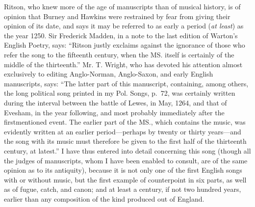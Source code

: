 \renewcommand\versoheader{manuscripts---thirteenth century.}
\renewcommand\rectoheader{sumer is icumen in.}

Ritson, who knew more of the age of manuscripts than of musical history, is
of opinion that Burney and Hawkins were restrained by fear from giving their
opinion of its date, and says it may be referred to as early a period (\textit{at least}) as
the year 1250. Sir Frederick Madden, %
in a note to the last edition of Warton’s
English Poetry, says: “Ritson justly exclaims against the ignorance of those who
refer the song to the fifteenth century, when the MS. itself is certainly of the
middle of the thirteenth.” Mr. T. Wright, who has devoted his attention
almost exclusively to editing Anglo-Norman, Anglo-Saxon, and early English
manuscripts, says: “The latter part of this manuscript, containing, among others,
the long political song printed in my Pol. Songs, p.~72, was certainly written
during the interval between the battle of Lewes, in May, 1264, and that of
Evesham, in the year following, and most probably immediately after the firstmentioned
event. The earlier part of the MS., 
which contains the music, was evidently written at an earlier \pagebreak period—perhaps by twenty or 
thirty years—and 
the song with its music must therefore be given to the first half of the thirteenth 
century, at latest.” I have thus entered into detail concerning this song
(though all the judges of manuscripts, whom I have been enabled to consult, are
of the same opinion as to its antiquity), because it is not only one of the first
English songs with or without music, but the first example of counterpoint in six
parts, as well as of fugue, catch, and canon; and at least a century, if not two
hundred years, earlier than any composition of the kind produced out of
England. %

